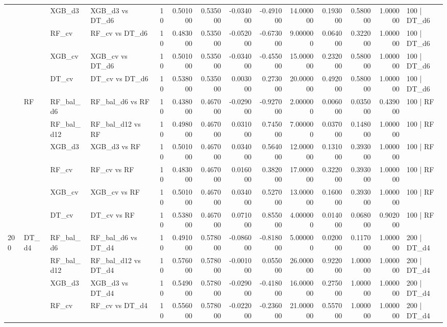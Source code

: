 \begin{tabular}{llllrrrrrrrrrl}
 &  & XGB_d3 & XGB_d3 vs DT_d6 & 10 & 0.501000 & 0.535000 & -0.034000 & -0.491000 & 14.000000 & 0.193000 & 0.580000 & 1.000000 & 100 | DT_d6 \\
 &  & RF_cv & RF_cv vs DT_d6 & 10 & 0.483000 & 0.535000 & -0.052000 & -0.673000 & 9.000000 & 0.064000 & 0.322000 & 1.000000 & 100 | DT_d6 \\
 &  & XGB_cv & XGB_cv vs DT_d6 & 10 & 0.501000 & 0.535000 & -0.034000 & -0.455000 & 15.000000 & 0.232000 & 0.580000 & 1.000000 & 100 | DT_d6 \\
 &  & DT_cv & DT_cv vs DT_d6 & 10 & 0.538000 & 0.535000 & 0.003000 & 0.273000 & 20.000000 & 0.492000 & 0.580000 & 1.000000 & 100 | DT_d6 \\
\cline{2-14}
 & \multirow[t]{6}{*}{RF} & RF_bal_d6 & RF_bal_d6 vs RF & 10 & 0.438000 & 0.467000 & -0.029000 & -0.927000 & 2.000000 & 0.006000 & 0.035000 & 0.439000 & 100 | RF \\
 &  & RF_bal_d12 & RF_bal_d12 vs RF & 10 & 0.498000 & 0.467000 & 0.031000 & 0.745000 & 7.000000 & 0.037000 & 0.148000 & 1.000000 & 100 | RF \\
 &  & XGB_d3 & XGB_d3 vs RF & 10 & 0.501000 & 0.467000 & 0.034000 & 0.564000 & 12.000000 & 0.131000 & 0.393000 & 1.000000 & 100 | RF \\
 &  & RF_cv & RF_cv vs RF & 10 & 0.483000 & 0.467000 & 0.016000 & 0.382000 & 17.000000 & 0.322000 & 0.393000 & 1.000000 & 100 | RF \\
 &  & XGB_cv & XGB_cv vs RF & 10 & 0.501000 & 0.467000 & 0.034000 & 0.527000 & 13.000000 & 0.160000 & 0.393000 & 1.000000 & 100 | RF \\
 &  & DT_cv & DT_cv vs RF & 10 & 0.538000 & 0.467000 & 0.071000 & 0.855000 & 4.000000 & 0.014000 & 0.068000 & 0.902000 & 100 | RF \\
\cline{1-14} \cline{2-14}
\multirow[t]{18}{*}{200} & \multirow[t]{6}{*}{DT_d4} & RF_bal_d6 & RF_bal_d6 vs DT_d4 & 10 & 0.491000 & 0.578000 & -0.086000 & -0.818000 & 5.000000 & 0.020000 & 0.117000 & 1.000000 & 200 | DT_d4 \\
 &  & RF_bal_d12 & RF_bal_d12 vs DT_d4 & 10 & 0.576000 & 0.578000 & -0.001000 & 0.055000 & 26.000000 & 0.922000 & 1.000000 & 1.000000 & 200 | DT_d4 \\
 &  & XGB_d3 & XGB_d3 vs DT_d4 & 10 & 0.549000 & 0.578000 & -0.029000 & -0.418000 & 16.000000 & 0.275000 & 1.000000 & 1.000000 & 200 | DT_d4 \\
 &  & RF_cv & RF_cv vs DT_d4 & 10 & 0.556000 & 0.578000 & -0.022000 & -0.236000 & 21.000000 & 0.557000 & 1.000000 & 1.000000 & 200 | DT_d4 \\

\end{tabular}

